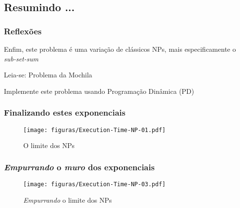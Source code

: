 \documentclass{beamer}
\begin{document}



\subsection{Resumindo ... }

\begin{frame}
\frametitle{Reflexões}
\begin{block}{}   %
\begin{flushleft}

\vspace{1cm}
 \textsf{Enfim, este problema é uma variação de clássicos
NPs, mais especificamente o \textit{sub-set-sum}}

\vspace{1cm}
 \textsf{Leia-se: Problema da Mochila}


\vspace{1cm}
 \textsf{Implemente este problema usando Programação Dinâmica (PD)}

      \end{flushleft}

    \end{block}
  \end{frame}




\begin{frame}
\frametitle{Finalizando estes exponenciais}

\begin{figure}[h!b]
\begin{center}
\texttt{[image: figuras/Execution-Time-NP-01.pdf]}
\caption{O limite dos NPs}
\label{fig_Execution-Time-NP-01}
\end{center}
\end{figure}


\end{frame}



\begin{frame}[fragile]
\frametitle{\textit{Empurrando} o \textit{muro} dos exponenciais}

\begin{figure}[!hb]
\begin{center}
\texttt{[image: figuras/Execution-Time-NP-03.pdf]}
\caption{{\em Empurrando} o limite dos NPs}
\label{fig_Execution-Time-NP-03}
\end{center}
\end{figure}


\end{frame}
\end{document}
